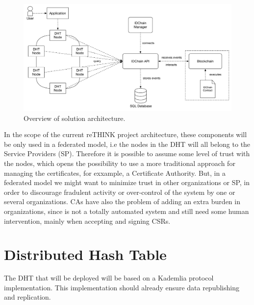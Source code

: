 \begin{figure}
  \includegraphics[width=\linewidth]{Figures/architecture-overview.pdf}
    \caption{Overview of solution architecture.}
    \label{fig:architecture-overview}
\end{figure}

In the scope of the current reTHINK project architecture, these components will be only used in a federated model, i.e the nodes in the \ac{DHT} will all belong to the Service Providers (SP).
Therefore it is possible to assume some level of trust with the nodes, which opens the possibility to use a more traditional approach for managing the certificates, for exxample, a Certificate Authority.
But, in a federated model we might want to minimize trust in other organizations or SP, in order to discourage fradulent activity or over-control of the system by one or several organizations.
\acp{CA} have also the problem of adding an extra burden in organizations, since is not a totally automated system and still need some human intervention, mainly when accepting and signing \acp{CSR}.


\section{Distributed Hash Table} \label{ssec:dht}

The DHT that will be deployed will be based on a Kademlia protocol implementation.
This implementation should already ensure data republishing and replication.

